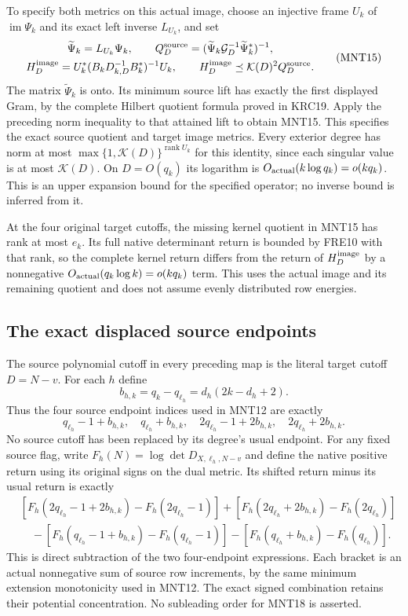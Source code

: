 \documentclass[11pt,a4paper]{article}
\begin{document}
To specify both metrics on this actual image, choose
an injective frame $U_k$ of $\operatorname{im}\Psi_k$
and its exact left inverse $L_{U_k}$, and set
\[
 \begin{gathered}
 \widetilde\Psi_k=L_{U_k}\Psi_k,\qquad
 Q_D^{\rm source}
    =(\widetilde\Psi_k\mathcal G_D^{-1}
                              \widetilde\Psi_k^*)^{-1},\\
 H_D^{\rm image}
     =U_k^*(B_kD_{k,D}^{-1}B_k^*)^{-1}U_k,\qquad
 H_D^{\rm image}\preceq\mathcal K(D)^2Q_D^{\rm source}.
 \end{gathered}\tag{MNT15}
\]
The matrix $\widetilde\Psi_k$ is onto. Its minimum
source lift has exactly the first displayed Gram,
by the complete Hilbert quotient formula proved in
KRC19. Apply the preceding norm inequality to that
attained lift to obtain MNT15.
This specifies the exact source quotient and target
image metrics. Every exterior degree has norm at most
$\max\{1,\mathcal K(D)\}^{\operatorname{rank}U_k}$ for
this identity, since each singular value is at most
$\mathcal K(D)$. On $D=O(q_k)$ its logarithm is
$O_{\rm actual}(k\log q_k)=o(kq_k)$.
This is an upper expansion bound for the specified
operator; no inverse bound is inferred from it.

At the four original target cutoffs, the missing
kernel quotient in MNT15 has rank at most $e_k$.
Its full native determinant return is bounded by
FRE10 with that rank, so the complete kernel return
differs from the return of $H_D^{\rm image}$ by a
nonnegative $O_{\rm actual}(q_k\log k)=o(kq_k)$ term.
This uses the actual image and its remaining quotient
and does not assume evenly distributed row energies.

\subsection{The exact displaced source endpoints}

The source polynomial cutoff in every preceding map
is the literal target cutoff $D=N-v$. For each $h$ define
\[
 b_{h,k}=q_k-q_{\ell_h}
            =d_h(2k-d_h+2).
 \tag{MNT16}
\]
Thus the four source endpoint indices used in MNT12
are exactly
\[
 q_{\ell_h}-1+b_{h,k},\quad
 q_{\ell_h}+b_{h,k},\quad
 2q_{\ell_h}-1+2b_{h,k},\quad
 2q_{\ell_h}+2b_{h,k}.
 \tag{MNT17}
\]
No source cutoff has been replaced by its degree's
usual endpoint. For any fixed source flag, write
$F_h(N)=\log\det D_{X,\ell_h,N-v}$ and define the
native positive return using its original signs on
the dual metric. Its shifted return minus its usual
return is exactly
\[
 \begin{split}
 &[F_h(2q_{\ell_h}-1+2b_{h,k})-F_h(2q_{\ell_h}-1)]
  +[F_h(2q_{\ell_h}+2b_{h,k})-F_h(2q_{\ell_h})]\\
 &\quad-[F_h(q_{\ell_h}-1+b_{h,k})-F_h(q_{\ell_h}-1)]
       -[F_h(q_{\ell_h}+b_{h,k})-F_h(q_{\ell_h})].
 \end{split}\tag{MNT18}
\]
This is direct subtraction of the two four-endpoint
expressions. Each bracket is an actual nonnegative
sum of source row increments, by the same minimum
extension monotonicity used in MNT12.
The exact signed combination retains their potential
concentration. No subleading order for MNT18 is asserted.
\end{document}
